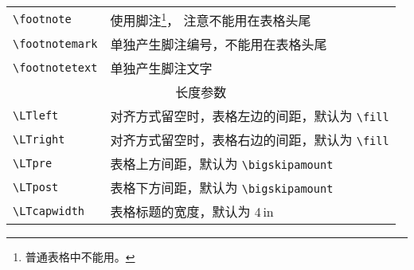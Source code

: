 \begin{longtable}{|l|l|}
\verb=\footnote= & 使用脚注\footnote{普通表格中不能用。}，
  注意不能用在表格头尾 \\
\verb=\footnotemark= & 单独产生脚注编号，不能用在表格头尾 \\
\verb=\footnotetext= & 单独产生脚注文字 \\
\hline \multicolumn{2}{|c|}{长度参数} \\ \hline
\verb=\LTleft= & 对齐方式留空时，表格左边的间距，默认为 \verb=\fill= \\
\verb=\LTright= & 对齐方式留空时，表格右边的间距，默认为 \verb=\fill= \\
\verb=\LTpre= & 表格上方间距，默认为 \verb=\bigskipamount= \\
\verb=\LTpost= & 表格下方间距，默认为 \verb=\bigskipamount= \\
\verb=\LTcapwidth= & 表格标题的宽度，默认为 4\,in \\
\end{longtable}
